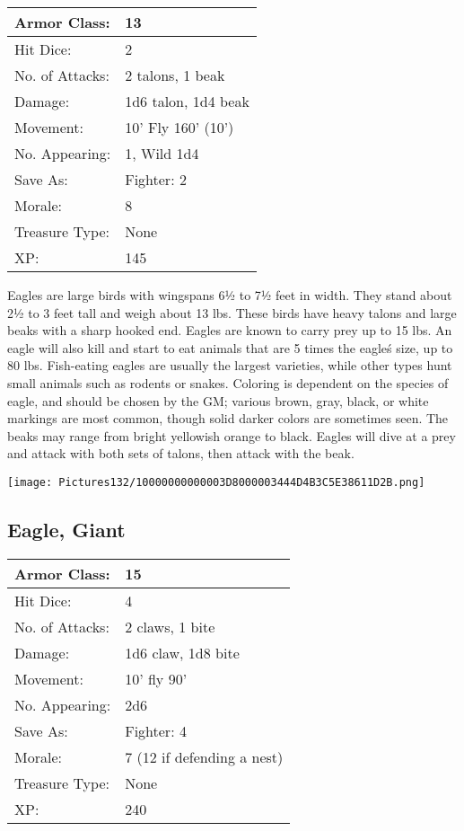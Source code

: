 \documentclass[a4paper,twoside,openany,10pt]{book}
\begin{document}
\begin{multicols}{2}
\begin{tabularx}{0.48\textwidth}{@{}lX@{}}
Armor Class: & 13 \\\hline
Hit Dice: & 2 \\\hline
No. of Attacks: & 2 talons, 1 beak \\\hline
Damage: & 1d6 talon, 1d4 beak \\\hline
Movement: & 10' Fly 160' (10') \\\hline
No. Appearing: & 1, Wild 1d4 \\\hline
Save As: & Fighter: 2 \\\hline
Morale: & 8 \\\hline
Treasure Type: & None \\\hline
XP: & 145 \\\hline
\end{tabularx}\medskip

Eagles are large birds with wingspans 6½ to 7½ feet in width. They stand about 2½ to 3 feet tall and weigh about 13 lbs. These birds have heavy talons and large beaks with a sharp hooked end. Eagles are known to carry prey up to 15 lbs. An eagle will also kill and start to eat animals that are 5 times the eagle\'s size, up to 80 lbs. Fish-eating eagles are usually the largest varieties, while other types hunt small animals such as rodents or snakes. Coloring is dependent on the species of eagle, and should be chosen by the GM; various brown, gray, black, or white markings are most common, though solid darker colors are sometimes seen. The beaks may range from bright yellowish orange to black. Eagles will dive at a prey and attack with both sets of talons, then attack with the beak.

\begin{center}
	\texttt{[image: Pictures132/10000000000003D8000003444D4B3C5E38611D2B.png]}
\end{center}

\subsection*{Eagle, Giant}\label{eagle-giant}

\begin{tabularx}{0.48\textwidth}{@{}lX@{}}
Armor Class: & 15 \\\hline
Hit Dice: & 4 \\\hline
No. of Attacks: & 2 claws, 1 bite \\\hline
Damage: & 1d6 claw, 1d8 bite \\\hline
Movement: & 10' fly 90' \\\hline
No. Appearing: & 2d6 \\\hline
Save As: & Fighter: 4 \\\hline
Morale: & 7 (12 if defending a nest) \\\hline
Treasure Type: & None \\\hline
XP: & 240 \\\hline
\end{tabularx}\medskip


\end{multicols}
\end{document}
